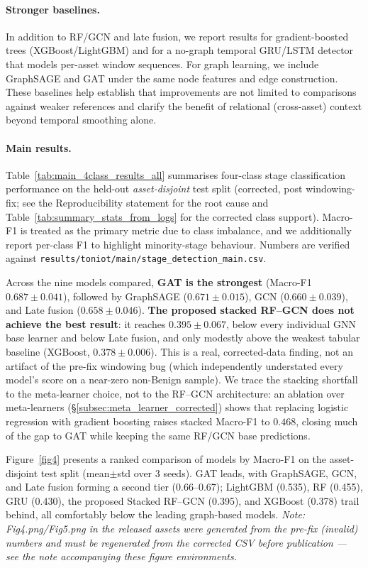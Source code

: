 \documentclass[pdflatex,sn-mathphys-num]{sn-jnl}
\theoremstyle{thmstyleone}%
\theoremstyle{thmstyletwo}%
\theoremstyle{thmstylethree}%
\begin{document}
\paragraph{Stronger baselines.}
In addition to RF/GCN and late fusion, we report results for gradient-boosted trees (XGBoost/LightGBM) and for a no-graph temporal GRU/LSTM detector that models per-asset window sequences.
For graph learning, we include GraphSAGE and GAT under the same node features and edge construction.
These baselines help establish that improvements are not limited to comparisons against weaker references and clarify the benefit of relational (cross-asset) context beyond temporal smoothing alone.

\paragraph{Main results.}
Table~\ref{tab:main_4class_results_all} summarises four-class stage classification performance on the held-out \emph{asset-disjoint} test split (corrected, post windowing-fix; see the Reproducibility statement for the root cause and Table~\ref{tab:summary_stats_from_logs} for the corrected class support). Macro-F1 is treated as the primary metric due to class imbalance, and we additionally report per-class F1 to highlight minority-stage behaviour. Numbers are verified against \texttt{results/toniot/main/stage\_detection\_main.csv}.

Across the nine models compared, \textbf{GAT is the strongest} (Macro-F1 $0.687\pm0.041$), followed by GraphSAGE ($0.671\pm0.015$), GCN ($0.660\pm0.039$), and Late fusion ($0.658\pm0.046$). \textbf{The proposed stacked RF--GCN does not achieve the best result}: it reaches $0.395\pm0.067$, below every individual GNN base learner and below Late fusion, and only modestly above the weakest tabular baseline (XGBoost, $0.378\pm0.006$). This is a real, corrected-data finding, not an artifact of the pre-fix windowing bug (which independently understated every model's score on a near-zero non-Benign sample). We trace the stacking shortfall to the meta-learner choice, not to the RF--GCN architecture: an ablation over meta-learners (\S\ref{subsec:meta_learner_corrected}) shows that replacing logistic regression with gradient boosting raises stacked Macro-F1 to $0.468$, closing much of the gap to GAT while keeping the same RF/GCN base predictions.

Figure~\ref{fig4} presents a ranked comparison of models by Macro-F1 on the asset-disjoint test split (mean$\pm$std over 3 seeds). GAT leads, with GraphSAGE, GCN, and Late fusion forming a second tier (0.66--0.67); LightGBM (0.535), RF (0.455), GRU (0.430), the proposed Stacked RF--GCN (0.395), and XGBoost (0.378) trail behind, all comfortably below the leading graph-based models. \emph{Note: Fig4.png/Fig5.png in the released assets were generated from the pre-fix (invalid) numbers and must be regenerated from the corrected CSV before publication --- see the note accompanying these figure environments.}
\end{document}
